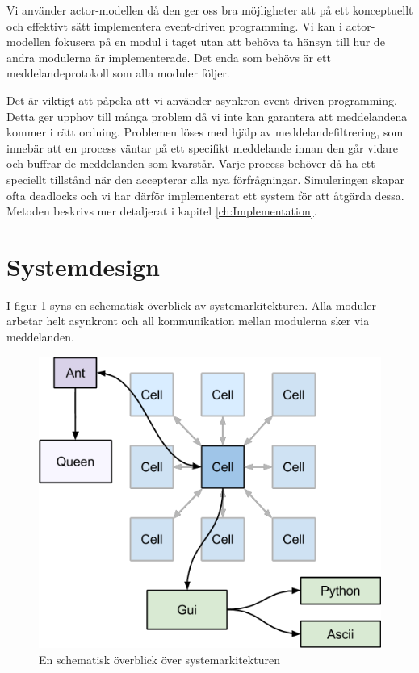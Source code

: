 Vi använder actor-modellen då den ger oss bra möjligheter att på ett konceptuellt och effektivt sätt implementera event-driven programming. Vi kan i actor-modellen fokusera på en modul i taget utan att behöva ta hänsyn till hur de andra modulerna är implementerade. Det enda som behövs är ett meddelandeprotokoll som alla moduler följer.

Det är viktigt att påpeka att vi använder asynkron event-driven programming. Detta ger upphov till många problem då vi inte kan garantera att meddelandena kommer i rätt ordning. Problemen löses med hjälp av meddelandefiltrering, som innebär att en process väntar på ett specifikt meddelande innan den går vidare och buffrar de meddelanden som kvarstår. Varje process behöver då ha ett speciellt tillstånd när den accepterar alla nya förfrågningar.
Simuleringen skapar ofta deadlocks och vi har därför implementerat ett system för att åtgärda dessa. Metoden beskrivs mer detaljerat i kapitel \ref{ch:Implementation}.

\section{Systemdesign}

I figur \ref{fig:design} syns en schematisk överblick av systemarkitekturen. Alla moduler arbetar helt asynkront och all kommunikation mellan modulerna sker via meddelanden.

\begin{figure}

\includegraphics[scale=0.8]{Figures/systemdesign.png}
\caption{En schematisk överblick över systemarkitekturen}
\label{fig:design}
\end{figure}


